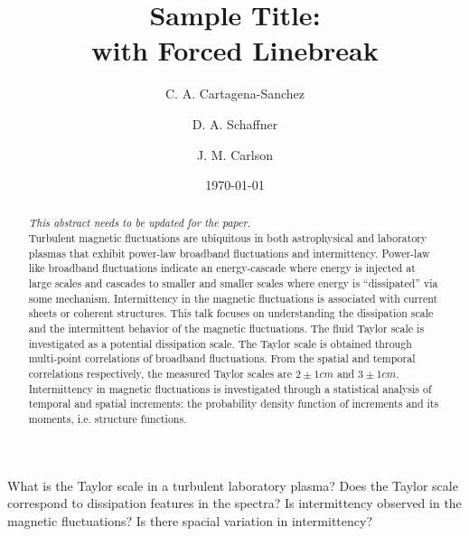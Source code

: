\documentclass[%
 aip,
 amsmath,amssymb,
preprint,%
]{revtex4-1}
\begin{document}

\title[Sample title]{Sample Title:\\with Forced Linebreak}
\author{C. A. Cartagena-Sanchez}

\author{D. A. Schaffner}%

\author{J. M. Carlson}
\date{\today}%

\begin{abstract}
\textit{This abstract needs to be updated for the paper.}\\
Turbulent magnetic fluctuations are ubiquitous in both astrophysical and laboratory plasmas that exhibit power-law broadband fluctuations and intermittency. Power-law like broadband fluctuations indicate an energy-cascade where energy is injected at large scales and cascades to smaller and smaller scales where energy is ``dissipated'' via some mechanism. Intermittency in the magnetic fluctuations is associated with current sheets or coherent structures. This talk focuses on understanding the dissipation scale and the intermittent behavior of the magnetic fluctuations. The fluid Taylor scale is investigated as a potential dissipation scale. The Taylor scale is obtained through multi-point correlations of broadband fluctuations. From the spatial and temporal correlations respectively, the measured Taylor scales are $2\pm1cm$ and $3\pm1cm$. Intermittency in magnetic fluctuations is investigated through a statistical analysis of temporal and spatial increments: the probability density function of increments and its moments, i.e. structure functions.
\end{abstract}

\maketitle

What is the Taylor scale in a turbulent laboratory plasma?
Does the Taylor scale correspond to dissipation features in the spectra?
Is intermittency observed in the magnetic fluctuations?
Is there spacial variation in intermittency?


\end{document}
